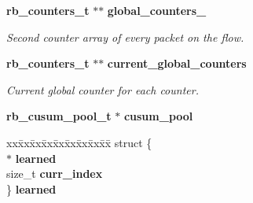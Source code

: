 \begin{DoxyCompactItemize}
{\bf rb\+\_\+counters\+\_\+t} $\ast$$\ast$ {\bf global\+\_\+counters\+\_}
\begin{DoxyCompactList}\small\item\em Second counter array of every packet on the flow. \end{DoxyCompactList}\item 
{\bf rb\+\_\+counters\+\_\+t} $\ast$$\ast$ {\bf current\+\_\+global\+\_\+counters}
\begin{DoxyCompactList}\small\item\em Current global counter for each counter. \end{DoxyCompactList}\item 
{\bf rb\+\_\+cusum\+\_\+pool\+\_\+t} $\ast$ {\bf cusum\+\_\+pool}
\item 
\begin{tabbing}
xx\=xx\=xx\=xx\=xx\=xx\=xx\=xx\=xx\=\kill
struct \{\\
 $\ast$ {\bf learned}\\
\>size\_t {\bf curr\_index}\\
\} {\bf learned}\\


\end{tabbing}
\end{DoxyCompactItemize}
